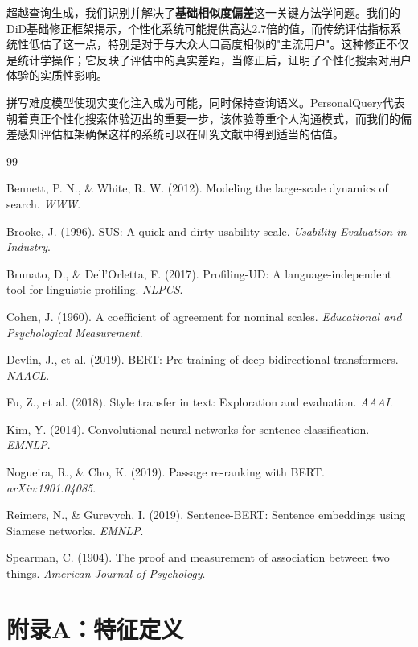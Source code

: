 \documentclass[11pt,a4paper]{article}
\begin{document}
超越查询生成，我们识别并解决了\textbf{基础相似度偏差}这一关键方法学问题。我们的DiD基础修正框架揭示，个性化系统可能提供高达2.7倍的值，而传统评估指标系统性低估了这一点，特别是对于与大众人口高度相似的"主流用户"。这种修正不仅是统计学操作；它反映了评估中的真实差距，当修正后，证明了个性化搜索对用户体验的实质性影响。

拼写难度模型使现实变化注入成为可能，同时保持查询语义。PersonalQuery代表朝着真正个性化搜索体验迈出的重要一步，该体验尊重个人沟通模式，而我们的偏差感知评估框架确保这样的系统可以在研究文献中得到适当的估值。

\begin{thebibliography}{99}

Bennett, P. N., \& White, R. W. (2012). Modeling the large-scale dynamics of search. \textit{WWW}.

Brooke, J. (1996). SUS: A quick and dirty usability scale. \textit{Usability Evaluation in Industry}.

Brunato, D., \& Dell'Orletta, F. (2017). Profiling-UD: A language-independent tool for linguistic profiling. \textit{NLPCS}.

Cohen, J. (1960). A coefficient of agreement for nominal scales. \textit{Educational and Psychological Measurement}.

Devlin, J., et al. (2019). BERT: Pre-training of deep bidirectional transformers. \textit{NAACL}.

Fu, Z., et al. (2018). Style transfer in text: Exploration and evaluation. \textit{AAAI}.

Kim, Y. (2014). Convolutional neural networks for sentence classification. \textit{EMNLP}.

Nogueira, R., \& Cho, K. (2019). Passage re-ranking with BERT. \textit{arXiv:1901.04085}.

Reimers, N., \& Gurevych, I. (2019). Sentence-BERT: Sentence embeddings using Siamese networks. \textit{EMNLP}.

Spearman, C. (1904). The proof and measurement of association between two things. \textit{American Journal of Psychology}.

\end{thebibliography}

\section*{附录A：特征定义}
\end{document}
